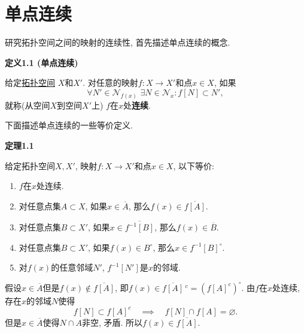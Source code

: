 


\setlength{\abovedisplayskip}{1pt}
\setlength{\belowdisplayskip}{1pt}

\section{单点连续}

研究拓扑空间之间的映射的连续性, 首先描述单点连续的概念.

\vspace{10pt}

\hypertarget{sec:定义1.1}{}
\noindent\textbf{定义1.1 (单点连续)}

给定\href{../01 拓扑空间的概念/01 拓扑空间#nameddest=sec:定义1.1}{拓扑空间}
$X$和$X'$. 对任意的映射$f:X\to X'$和点$x\in X$, 如果
\[
    \forall N'\in\mathcal{N}_{f(x)}\,\,\exists N\in\mathcal{N}_x:f[N]\subset N',
\]
就称(从空间$X$到空间$X'$上) $f$在$x$处\textbf{连续}.

\vspace{10pt}

下面描述单点连续的一些等价定义.

\vspace{10pt}

\hypertarget{sec:定理1.1}{}
\noindent\textbf{定理1.1}

给定拓扑空间$X,X'$, 映射$f:X\to X'$和点$x\in X$, 以下等价:
\begin{enumerate}
    \item $f$在$x$处连续.
    \item 对任意点集$A\subset X$, 如果$x\in\overline{A}$,
    那么$f(x)\in\overline{f[A]}$.
    \item 对任意点集$B\subset X'$, 如果$x\in\overline{f^{-1}[B]}$,
    那么$f(x)\in\overline{B}$.
    \item 对任意点集$B\subset X'$, 如果$f(x)\in B^\circ$,
    那么$x\in f^{-1}[B]^\circ$.
    \item 对$f(x)$的任意邻域$N'$, $f^{-1}[N']$是$x$的邻域.
\end{enumerate}



假设$x\in\overline{A}$但是$f(x)\notin\overline{f[A]}$,
即$f(x)\in\overline{f[A]}\,^c=(f[A]^c)^\circ$. 由$f$在$x$处连续,
存在$x$的邻域$N$使得
\[
    f[N]\subset f[A]^c\quad\implies\quad f[N]\cap f[A]=\varnothing.
\]
但是$x\in\overline{A}$使得$N\cap A$非空, 矛盾. 所以$f(x)\in\overline{f[A]}$.

